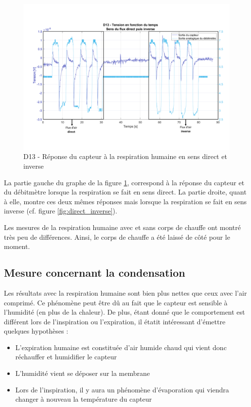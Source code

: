 \begin{figure}[H]
    \centering
    \includegraphics[scale = 0.6]{assets/figures/D13_human_breath_direct_invert_blue.pdf}
    \caption{D13 - Réponse du capteur à la respiration humaine en sens direct et inverse}
    \label{fig:D13_human_breath_direct_invert}
\end{figure}

La partie gauche du graphe de la figure \ref{fig:D13_human_breath_direct_invert}, correspond à la réponse du capteur et du débitmètre lorsque la 
respiration se fait en sens direct. La partie droite, quant à elle, montre ces deux mêmes réponses mais lorsque la respiration se fait en sens 
inverse (cf. figure \ref{fig:direct_inverse}). 

Les mesures de la respiration humaine avec et sans corps de chauffe ont montré très peu de différences. Ainsi, le corps de chauffe a été laissé 
de côté pour le moment. 

\subsection{Mesure concernant la condensation}
Les résultats avec la respiration humaine sont bien plus nettes que ceux avec l'air comprimé. Ce phénomène peut être dû au fait que le capteur 
est sensible à l'humidité (en plus de la chaleur). De plus, étant donné que le comportement est différent lors de l'inspiration ou l'expiration, 
il étatit intéressant d'émettre quelques hypothèses :
\begin{itemize}
    \item L'expiration humaine est constituée d'air humide chaud qui vient donc réchauffer et humidifier le capteur
    \item L'humidité vient se déposer sur la membrane
    \item Lors de l'inspiration, il y aura un phénomène d'évaporation qui viendra changer à nouveau la température du capteur
\end{itemize}

